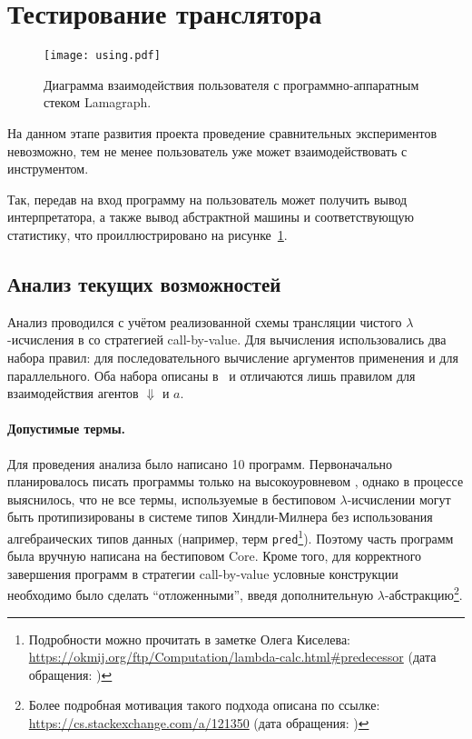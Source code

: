 
\section{Тестирование транслятора}

\begin{figure}[h]
    \begin{center}
        \texttt{[image: using.pdf]}
    \end{center}
    \caption{Диаграмма взаимодействия пользователя с программно-аппаратным стеком Lamagraph.}
    \label{fig:using}
\end{figure}

На данном этапе развития проекта проведение сравнительных экспериментов невозможно, тем не менее пользователь уже может взаимодействовать с инструментом.

Так, передав на вход программу на \LamagraphML{} пользователь может получить вывод интерпретатора, а также вывод абстрактной машины и соответствующую статистику, что проиллюстрировано на рисунке~\ref{fig:using}.

\subsection*{Анализ текущих возможностей}

Анализ проводился с учётом реализованной схемы трансляции чистого $\lambda$-исчисления в \INs{} со стратегией call-by-value.
Для вычисления использовались два набора правил: для последовательного вычисление аргументов применения и для параллельного.
Оба набора описаны в~\cite{sinotCallbyNameCallbyValueTokenPassing2005} и отличаются лишь правилом для взаимодействия агентов $\Downarrow$ и $a$.

\paragraph{Допустимые термы.}
Для проведения анализа было написано 10 программ.
Первоначально планировалось писать программы только на высокоуровневом \LamagraphML{}, однако в процессе выяснилось, что не все термы, используемые в бестиповом $\lambda$-исчислении могут быть протипизированы в системе типов Хиндли-Милнера без использования алгебраических типов данных (например, терм \texttt{pred}\footnote{Подробности можно прочитать в заметке Олега Киселева: \url{https://okmij.org/ftp/Computation/lambda-calc.html\#predecessor} (дата обращения: )}).
Поэтому часть программ была вручную написана на бестиповом Core.
Кроме того, для корректного завершения программ в стратегии call-by-value условные конструкции необходимо было сделать \enquote{отложенными}, введя дополнительную $\lambda$-абстракцию\footnote{Более подробная мотивация такого подхода описана по ссылке: \url{https://cs.stackexchange.com/a/121350} (дата обращения: )}.

